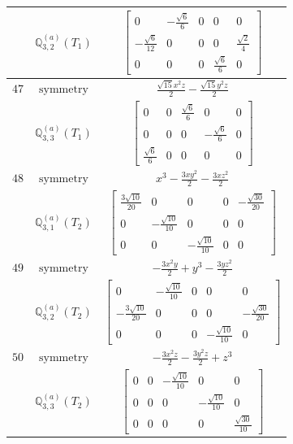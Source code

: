 \documentclass[fleqn,8pt,landscape]{jsarticle}
\begin{document}
\begin{longtable}{ccc}
$  $ & $ \mathbb{Q}_{3,2}^{(a)}(T_{1}) $ & $ \begin{bmatrix} 0 & - \frac{\sqrt{6}}{6} & 0 & 0 & 0 \\ - \frac{\sqrt{6}}{12} & 0 & 0 & 0 & \frac{\sqrt{2}}{4} \\ 0 & 0 & 0 & \frac{\sqrt{6}}{6} & 0 \end{bmatrix} $ \\ \hline
$ 47 $ & $ \text{symmetry} $ & $ \frac{\sqrt{15} x^{2} z}{2} - \frac{\sqrt{15} y^{2} z}{2} $ \\
$  $ & $ \mathbb{Q}_{3,3}^{(a)}(T_{1}) $ & $ \begin{bmatrix} 0 & 0 & \frac{\sqrt{6}}{6} & 0 & 0 \\ 0 & 0 & 0 & - \frac{\sqrt{6}}{6} & 0 \\ \frac{\sqrt{6}}{6} & 0 & 0 & 0 & 0 \end{bmatrix} $ \\ \hline
$ 48 $ & $ \text{symmetry} $ & $ x^{3} - \frac{3 x y^{2}}{2} - \frac{3 x z^{2}}{2} $ \\
$  $ & $ \mathbb{Q}_{3,1}^{(a)}(T_{2}) $ & $ \begin{bmatrix} \frac{3 \sqrt{10}}{20} & 0 & 0 & 0 & - \frac{\sqrt{30}}{20} \\ 0 & - \frac{\sqrt{10}}{10} & 0 & 0 & 0 \\ 0 & 0 & - \frac{\sqrt{10}}{10} & 0 & 0 \end{bmatrix} $ \\ \hline
$ 49 $ & $ \text{symmetry} $ & $ - \frac{3 x^{2} y}{2} + y^{3} - \frac{3 y z^{2}}{2} $ \\
$  $ & $ \mathbb{Q}_{3,2}^{(a)}(T_{2}) $ & $ \begin{bmatrix} 0 & - \frac{\sqrt{10}}{10} & 0 & 0 & 0 \\ - \frac{3 \sqrt{10}}{20} & 0 & 0 & 0 & - \frac{\sqrt{30}}{20} \\ 0 & 0 & 0 & - \frac{\sqrt{10}}{10} & 0 \end{bmatrix} $ \\ \hline
$ 50 $ & $ \text{symmetry} $ & $ - \frac{3 x^{2} z}{2} - \frac{3 y^{2} z}{2} + z^{3} $ \\
$  $ & $ \mathbb{Q}_{3,3}^{(a)}(T_{2}) $ & $ \begin{bmatrix} 0 & 0 & - \frac{\sqrt{10}}{10} & 0 & 0 \\ 0 & 0 & 0 & - \frac{\sqrt{10}}{10} & 0 \\ 0 & 0 & 0 & 0 & \frac{\sqrt{30}}{10} \end{bmatrix} $ \\ \hline

\end{longtable}
\end{document}
